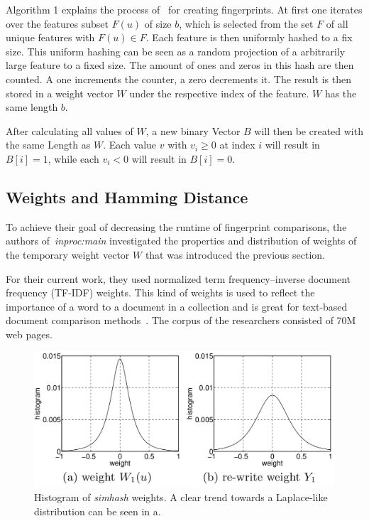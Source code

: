 \documentclass[12pt,a4paper,DIV=calc]{scrartcl}
\begin{document}
Algorithm 1 explains the process of~\cite{inproc:evaluation} for creating fingerprints.
At first one iterates over the features subset $F(u)$ of size $b$, which is selected from the set $F$ of all unique features with $F(u) \in F$.
Each feature is then uniformly hashed to a fix size.
This uniform hashing can be seen as a random projection of a arbitrarily large feature to a fixed size.
The amount of ones and zeros in this hash are then counted.
A one increments the counter, a zero decrements it.
The result is then stored in a weight vector $W$ under the respective index of the feature. $W$ has the same length $b$.

After calculating all values of $W$, a new binary Vector $B$ will then be created with the same Length as $W$.
Each value $v$ with $v_i \geq 0$ at index $i$ will result in $B[i] = 1$, while each $v_i < 0$ will result in $B[i] = 0$.

\subsection{Weights and Hamming Distance}

To achieve their goal of decreasing the runtime of fingerprint comparisons, the authors of~\emph{inproc:main} investigated the properties and distribution of weights of the temporary weight vector $W$ that was introduced the previous section.

For their current work, they used normalized term frequency–inverse document frequency (TF-IDF) weights.
This kind of weights is used to reflect the importance of a word to a document in a collection and is great for text-based document comparison methods~\cite{Salton:1986:IMI:576628}.
The corpus of the researchers consisted of 70M web pages.

\begin{figure}[H]
\includegraphics[scale=0.4]{./gfx/distribution.png}
\centering
\caption{Histogram of \emph{simhash} weights. A clear trend towards a Laplace-like distribution can be seen in a\).}\label{fig:weight-distribution}
\end{figure}
\end{document}
